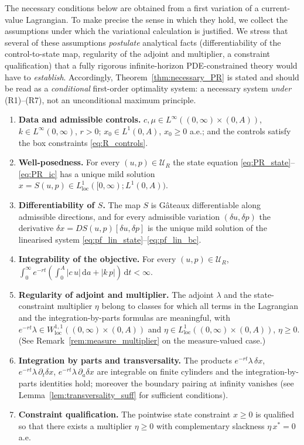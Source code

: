 \documentclass[pdflatex,sn-mathphys-num]{sn-jnl}
\theoremstyle{definition}
\theoremstyle{remark}
\newcommand{\dd}{\,\mathrm{d}}
\begin{document}
The necessary conditions below are obtained from a first variation of a
current-value Lagrangian. To make precise the sense in which they hold, we
collect the assumptions under which the variational calculation is justified.
We stress that several of these assumptions
\emph{postulate} analytical facts (differentiability of the control-to-state
map, regularity of the adjoint and multiplier, a constraint qualification)
that a fully rigorous infinite-horizon PDE-constrained theory would have to
\emph{establish}. Accordingly, Theorem~\ref{thm:necessary_PR} is stated and
should be read as a \emph{conditional} first-order optimality system: a
necessary system \emph{under} (R1)--(R7), not an unconditional maximum
principle.

\begin{enumerate}[leftmargin=3.4em]
    \item[\textup{(R1)}] \textbf{Data and admissible controls.}
    $c,\mu\in L^\infty((0,\infty)\times(0,A))$, $k\in L^\infty(0,\infty)$,
    $r>0$; $x_0\in L^1(0,A)$, $x_0\ge0$ a.e.; and the controls satisfy the
    box constraints \eqref{eq:R_controls}.
    \item[\textup{(R2)}] \textbf{Well-posedness.} For every
    $(u,p)\in\mathcal{U}_R$ the state equation
    \eqref{eq:PR_state}--\eqref{eq:PR_ic} has a unique mild solution
    $x=S(u,p)\in L^1_{\mathrm{loc}}([0,\infty);L^1(0,A))$.
    \item[\textup{(R3)}] \textbf{Differentiability of $S$.} The map $S$ is
    G\^ateaux differentiable along admissible directions, and for every
    admissible variation $(\delta u,\delta p)$ the derivative
    $\delta x=DS(u,p)[\delta u,\delta p]$ is the unique mild solution of the
    linearised system \eqref{eq:pf_lin_state}--\eqref{eq:pf_lin_bc}.
    \item[\textup{(R4)}] \textbf{Integrability of the objective.} For every
    $(u,p)\in\mathcal{U}_R$,
    $\int_0^\infty e^{-rt}(\int_0^A|c\,u|\dd a+|k\,p|)\dd t<\infty$.
    \item[\textup{(R5)}] \textbf{Regularity of adjoint and multiplier.} The
    adjoint $\lambda$ and the state-constraint multiplier $\eta$ belong to
    classes for which all terms in the Lagrangian and the
    integration-by-parts formulas are meaningful, with
    $e^{-rt}\lambda\in W^{1,1}_{\mathrm{loc}}((0,\infty)\times(0,A))$ and
    $\eta\in L^1_{\mathrm{loc}}((0,\infty)\times(0,A))$, $\eta\ge0$. (See
    Remark~\ref{rem:measure_multiplier} on the measure-valued case.)
    \item[\textup{(R6)}] \textbf{Integration by parts and transversality.}
    The products $e^{-rt}\lambda\,\delta x$, $e^{-rt}\lambda\,\partial_t\delta
    x$, $e^{-rt}\lambda\,\partial_a\delta x$ are integrable on finite
    cylinders and the integration-by-parts identities hold; moreover the
    boundary pairing at infinity vanishes (see
    Lemma~\ref{lem:transversality_suff} for sufficient conditions).
    \item[\textup{(R7)}] \textbf{Constraint qualification.} The pointwise
    state constraint $x\ge0$ is qualified so that there exists a multiplier
    $\eta\ge0$ with complementary slackness $\eta\,x^\ast=0$ a.e.
\end{enumerate}
\end{document}
